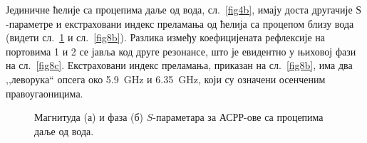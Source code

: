 \documentclass[main.tex]{subfiles}
\begin{document}
Јединичне ћелије са процепима даље од вода, сл.~\ref{fig4b}, имају доста другачије $Ѕ$-параметре и екстраховани индекс преламања од ћелија са процепом близу вода (видети сл.~\ref{fig8} и сл.~\ref{fig8b}). Разлика између коефицијената рефлексије на портовима 1 и 2 се јавља код друге резонансе, што је евидентно у њиховој фази на сл.~\ref{fig8c}. Екстраховани индекс преламања, приказан на сл.~\ref{fig8b}, има два ,,леворука`` опсега око \SI{5.9}{\giga\hertz} и \SI{6.35}{\giga\hertz}, који су означени осенченим правоугаоницима.
\begin{figure}[!t]
\hfill
{}
\caption{Магнитуда (а) и фаза (б) $S$-параметара за АСРР-ове са процепима даље од вода.}
\label{fig8}
\end{figure}
\end{document}

